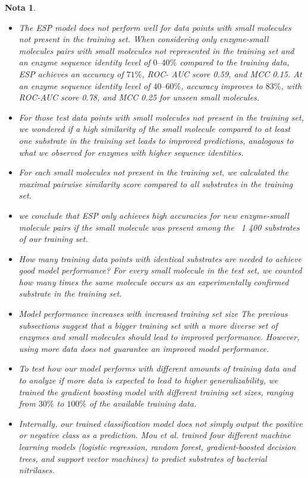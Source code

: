 \documentclass[12pt]{article}
\newtheorem{Note}{Nota}%
\begin{document}
\begin{Note}
\begin{itemize}
\item The ESP model does not perform well for data points with small molecules not present in the training set. When considering only
enzyme-small molecules pairs with small molecules not represented in the training set and an enzyme sequence identity level of $0–40\%$ compared to the training data, ESP achieves an accuracy of $71\%$, ROC- AUC score 0.59, and MCC 0.15. At an enzyme sequence identity level of $40–60\%$, accuracy improves to $83\%$, with ROC-AUC score 0.78, and MCC 0.25 for unseen small molecules.


\item For those test data points with small molecules not present in the training set, we wondered if a high similarity of the small molecule compared to at least one substrate in the training set leads to improved predictions, analogous to what we observed for enzymes with higher sequence identities. 

\item For each small molecules not present in the training set, we calculated the maximal pairwise similarity score compared to all substrates in the training set. 

\item we conclude that ESP only achieves high accuracies for new enzyme-small molecule pairs if the small molecule was present among the ~1 400 substrates of our training set.


\item How many training data points with identical substrates are needed to achieve good model performance? For every small molecule in the test set, we counted how many times the same molecule occurs as an experimentally confirmed substrate in the training set. 

\item Model performance increases with increased training set size The previous subsections suggest that a bigger training set with a more diverse set of enzymes and small molecules should lead to improved performance. However, using more data does not guarantee an improved model performance. 

\item To test how our model performs with different amounts of training data and to analyze if more data is expected to lead to higher generalizability, we trained the gradient boosting model with different training set sizes, ranging from $30\%$ to $100\%$ of the available training data.

\item Internally, our trained classification  model does not simply output the positive or negative class as a prediction. Mou et al.\cite{2.14} trained four different machine learning models (logistic regression, random forest, gradient-boosted decision trees,
and support vector machines) to predict substrates of bacterial nitrilases. 


\end{itemize}
\end{Note}
\end{document}
